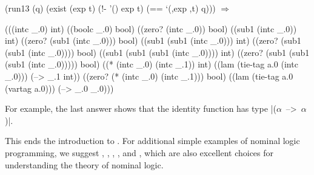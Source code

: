 \schemedisplayspace
\begin{schemedisplay}
(run13 (q)
  (exist (exp t)
    (!- '() exp t)
    (== `(,exp ,t) q))) $\Rightarrow$
\end{schemedisplay}
\nspace
\begin{schemeresponse}
(((intc _.0) int)
 ((boolc _.0) bool)
 ((zero? (intc _.0)) bool)
 ((sub1 (intc _.0)) int)
 ((zero? (sub1 (intc _.0))) bool)
 ((sub1 (sub1 (intc _.0))) int)
 ((zero? (sub1 (sub1 (intc _.0)))) bool)
 ((sub1 (sub1 (sub1 (intc _.0)))) int)
 ((zero? (sub1 (sub1 (sub1 (intc _.0))))) bool)
 ((* (intc _.0) (intc _.1)) int)
 ((lam (tie-tag a.0 (intc _.0))) (--> _.1 int))
 ((zero? (* (intc _.0) (intc _.1))) bool)
 ((lam (tie-tag a.0 (vartag a.0))) (--> _.0 _.0)))
\end{schemeresponse}

\noindent For example, the last answer shows that the identity
function has type \mbox{\schemeresult|($\alpha$ --> $\alpha$)|}.

This ends the introduction to \alphakanren.  For additional simple examples of
nominal logic programming, we suggest \citet{cheneyurban08}, \citet{CheneyThesis},
\citet{CheneyU04}, \citet{Urban-Pitts-Gabbay/04}, and
\citet{lakin2007}, which are also excellent choices for understanding
the theory of nominal logic.
